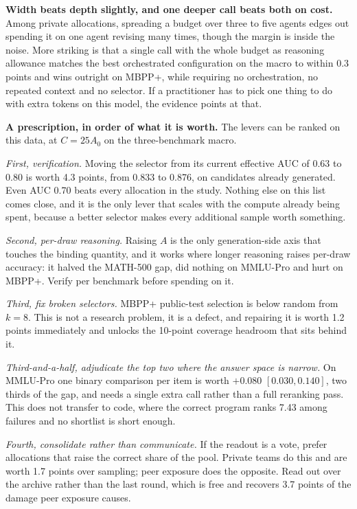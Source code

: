 \documentclass[11pt]{article}
\begin{document}
\textbf{Width beats depth slightly, and one deeper call beats both on cost.} Among private
allocations, spreading a budget over three to five agents edges out spending it on one agent
revising many times, though the margin is inside the noise. More striking is that a single call with
the whole budget as reasoning allowance matches the best orchestrated configuration on the macro to
within 0.3 points and wins outright on MBPP+, while requiring no orchestration, no repeated context
and no selector. If a practitioner has to pick one thing to do with extra tokens on this model, the
evidence points at that.

\textbf{A prescription, in order of what it is worth.} The levers can be ranked on this data, at
$C = 25A_0$ on the three-benchmark macro.

\emph{First, verification.} Moving the selector from its current effective AUC of 0.63 to 0.80 is
worth 4.3 points, from 0.833 to 0.876, on candidates already generated. Even AUC 0.70 beats every
allocation in the study. Nothing else on this list comes close, and it is the only lever that scales
with the compute already being spent, because a better selector makes every additional sample worth
something.

\emph{Second, per-draw reasoning.} Raising $A$ is the only generation-side axis that touches the
binding quantity, and it works where longer reasoning raises per-draw accuracy: it halved the
MATH-500 gap, did nothing on MMLU-Pro and hurt on MBPP+. Verify per benchmark before spending on it.

\emph{Third, fix broken selectors.} MBPP+ public-test selection is below random from $k=8$. This is
not a research problem, it is a defect, and repairing it is worth 1.2 points immediately and unlocks
the 10-point coverage headroom that sits behind it.

\emph{Third-and-a-half, adjudicate the top two where the answer space is narrow.} On MMLU-Pro one
binary comparison per item is worth $+0.080$ $[0.030, 0.140]$, two thirds of the gap, and needs a
single extra call rather than a full reranking pass. This does not transfer to code, where the
correct program ranks 7.43 among failures and no shortlist is short enough.

\emph{Fourth, consolidate rather than communicate.} If the readout is a vote, prefer allocations that
raise the correct share of the pool. Private teams do this and are worth 1.7 points over sampling;
peer exposure does the opposite. Read out over the archive rather than the last round, which is free
and recovers 3.7 points of the damage peer exposure causes.
\end{document}
